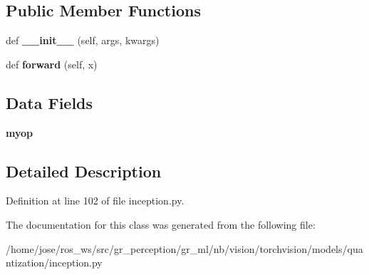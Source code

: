 \subsection*{Public Member Functions}
\begin{DoxyCompactItemize}
\item 
\mbox{\label{classtorchvision_1_1models_1_1quantization_1_1inception_1_1QuantizableInceptionA_a105280eb5b873c211f21cbcaae72fa11}} 
def {\bfseries \+\_\+\+\_\+init\+\_\+\+\_\+} (self, args, kwargs)
\item 
\mbox{\label{classtorchvision_1_1models_1_1quantization_1_1inception_1_1QuantizableInceptionA_ac65080ef43a5717a919c17b9e5db0861}} 
def {\bfseries forward} (self, x)
\end{DoxyCompactItemize}
\subsection*{Data Fields}
\begin{DoxyCompactItemize}
\item 
\mbox{\label{classtorchvision_1_1models_1_1quantization_1_1inception_1_1QuantizableInceptionA_a33ef5ed7daad56a44a4bd923c1ee2d81}} 
{\bfseries myop}
\end{DoxyCompactItemize}


\subsection{Detailed Description}


Definition at line 102 of file inception.\+py.



The documentation for this class was generated from the following file\+:\begin{DoxyCompactItemize}
\item 
/home/jose/ros\+\_\+ws/src/gr\+\_\+perception/gr\+\_\+ml/nb/vision/torchvision/models/quantization/inception.\+py\end{DoxyCompactItemize}
